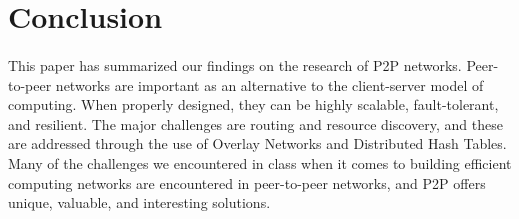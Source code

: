 \documentclass[12pt,letterpaper]{article}
\begin{document}

\section{Conclusion}

\paragraph{}
This paper has summarized our findings on the research of P2P networks. 
Peer-to-peer networks are important as an alternative to the client-server model of computing. 
When properly designed, they can be highly scalable, fault-tolerant, and resilient. 
The major challenges are routing and resource discovery, and these are addressed through the use of Overlay Networks and Distributed Hash Tables. 
Many of the challenges we encountered in class when it comes to building efficient computing networks are encountered in peer-to-peer networks, and P2P offers unique, valuable, and interesting solutions.



\end{document}

